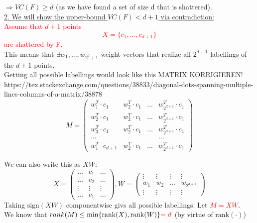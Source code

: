 \documentclass[10pt,a4paper]{article}
\theoremstyle{definition}
\theoremstyle{plain}
\begin{document}
	$\Rightarrow VC(F) \geq d$ (as we have found a set of size d that is shattered).\\
	

\underline{2. We will show the upper-bound $VC(F) < d+1$ via contradiction:}
	\\
	\textcolor{red}{
		Assume that $d+1$ points $$X = \{ c_1, ..., c_{d+1} \}$$ are shattered by F.}\\
			
	This means that $\exists w_1, ..., w_{2^d+1}$ weight vectors that realize all $2^{d+1}$ labellings of the $d+1$ points. \\
	Getting all possible labellings would look like this
	MATRIX KORRIGIEREN!  https://tex.stackexchange.com/questions/38833/diagonal-dots-spanning-multiple-lines-columns-of-a-matrix/38878
	$$
	M = \left(\begin{array}{cccc}
		w_1^T \cdot c_1 & w_2^T \cdot c_1 & ... & w_{2^{d+1}}^T \cdot c_1 \\
		w_2^T \cdot c_1 & w_2^T \cdot c_1 & ... & w_{2^{d+1}}^T \cdot c_1 \\
		w_3^T \cdot c_1 & w_2^T \cdot c_1 & ... & w_{2^{d+1}}^T \cdot c_1 \\
		... &   &   &  ... \\
		w_1^T \cdot c_{d+1} & w_2^T \cdot c_1 & ... & w_{2^{d+1}}^T \cdot c_1 \end{array}\right)
	$$
	
	We can also write this as $XW$:
	$$
		X = \left(\begin{array}{ccc}
			\hdots & c_1 & \hdots \\
			 \hdots & c_2 & \hdots\\
			 \vdots & \vdots & \vdots \\
			\hdots & c_1 & \hdots
		\end{array}\right), 
		W = \left(\begin{array}{cccc}
			\vdots & \vdots & \vdots & \vdots \\
			w_1 & w_2 & \hdots & w_{2^{d+1}}\\
			\vdots & \vdots & \vdots & \vdots
		\end{array}\right)
	$$
	Taking $\text{sign}(XW)$ componentwise givs all possible labellings. Let \textcolor{red}{$M = XW$}.\\
	We know that $rank(M) \leq \min\{ \text{rank}(X), \text{rank}(W) \} \textcolor{red}{= d}$ (by virtue of $\text{rank}(\cdot)$)
	
\end{document}
